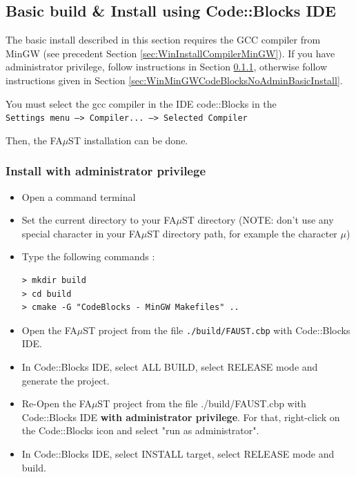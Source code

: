 \subsection{Basic build \& Install using Code::Blocks IDE}
\label{sec:WinCodeBlocksBasicInstall}

The basic install described in this section requires the GCC compiler from MinGW (see precedent Section \ref{sec:WinInstallCompilerMinGW}).
If you have administrator privilege, follow instructions in Section \ref{sec:WinMinGWCodeBlocksAdminBasicInstall}, otherwise follow instructions given in Section \ref{sec:WinMinGWCodeBlocksNoAdminBasicInstall}.

You must select the gcc compiler in the IDE code::Blocks in the \\ \texttt{Settings menu --> Compiler... --> Selected Compiler }  

Then, the FA$\mu$ST installation can be done. 

\subsubsection{Install with administrator privilege}
\label{sec:WinMinGWCodeBlocksAdminBasicInstall}
\begin{itemize}
\item Open a command terminal
\item Set the current directory to your FA$\mu$ST directory (NOTE: don't use any special character in your FA$\mu$ST directory path, for example the character $\mu$)
\item Type the following commands : 

\lstset{style=customBash}
\begin{lstlisting}
> mkdir build
> cd build
> cmake -G "CodeBlocks - MinGW Makefiles" .. 
\end{lstlisting}
\item Open the FA$\mu$ST project from the file \texttt{./build/FAUST.cbp} with Code::Blocks IDE.
\item In Code::Blocks IDE, select ALL BUILD, select RELEASE mode and generate the project.
\item Re-Open the FA$\mu$ST project from the file ./build/FAUST.cbp with Code::Blocks IDE \textbf{with administrator privilege}. For that, right-click on the Code::Blocks icon and select "run as administrator". 
\item In Code::Blocks IDE, select INSTALL target, select RELEASE mode and build.
\end{itemize}

